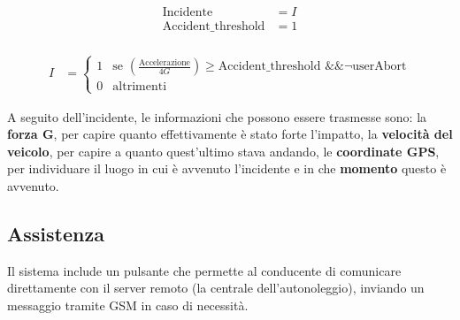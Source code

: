 \documentclass[12pt, a4paper, italian]{report}
\numberwithin{figure}{chapter}
\numberwithin{table}{chapter}
\begin{document}
\begin{flushleft}
    \begin{minipage}[t]{0.3\textwidth}
        \scriptsize
        \begin{align*}
            \text{Incidente} &= I \\
            \text{Accident\_threshold} &= 1 \\
        \end{align*}
    \end{minipage}
    \vspace{0.5cm} %
    \begin{minipage}[t]{0.7\textwidth}
        \begin{align*}
            I &= 
            \begin{cases}
                1 & \text{se } \left( \frac{\text{Accelerazione}}{4G} \right) \geq \text{Accident\_threshold} \text{ \&\& } \neg\text{userAbort} \\
                0 & \text{altrimenti}
            \end{cases}
        \end{align*}
    \end{minipage}
\end{flushleft}

A seguito dell'incidente, le informazioni che possono essere trasmesse sono: la \textbf{forza G}, per capire quanto effettivamente è stato forte l'impatto, la \textbf{velocità del veicolo}, per capire a quanto quest'ultimo stava andando, le \textbf{coordinate GPS}, per individuare il luogo in cui è avvenuto l'incidente e in che \textbf{momento} questo è avvenuto.

\subsection{Assistenza}
Il sistema include un pulsante che permette al conducente di comunicare direttamente con il server remoto (la centrale dell'autonoleggio), inviando un messaggio tramite GSM in caso di necessità.
\end{document}
